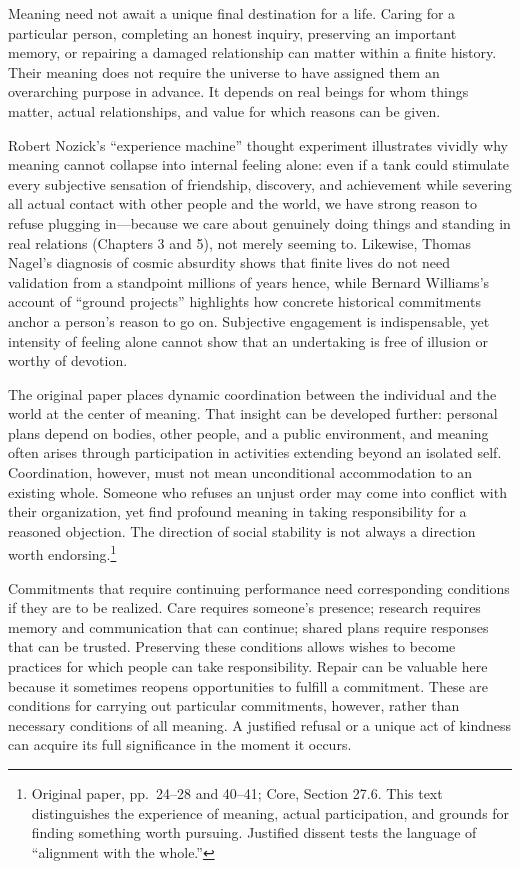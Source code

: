 \documentclass[
  english,
  11pt,
  oneside]{book}
\begin{document}
Meaning need not await a unique final destination for a life. Caring for a particular person, completing an honest inquiry, preserving an important memory, or repairing a damaged relationship can matter within a finite history. Their meaning does not require the universe to have assigned them an overarching purpose in advance. It depends on real beings for whom things matter, actual relationships, and value for which reasons can be given.

Robert Nozick's ``experience machine'' thought experiment illustrates vividly why meaning cannot collapse into internal feeling alone: even if a tank could stimulate every subjective sensation of friendship, discovery, and achievement while severing all actual contact with other people and the world, we have strong reason to refuse plugging in---because we care about genuinely doing things and standing in real relations (Chapters 3 and 5), not merely seeming to. Likewise, Thomas Nagel's diagnosis of cosmic absurdity shows that finite lives do not need validation from a standpoint millions of years hence, while Bernard Williams's account of ``ground projects'' highlights how concrete historical commitments anchor a person's reason to go on. Subjective engagement is indispensable, yet intensity of feeling alone cannot show that an undertaking is free of illusion or worthy of devotion.

The original paper places dynamic coordination between the individual and the world at the center of meaning. That insight can be developed further: personal plans depend on bodies, other people, and a public environment, and meaning often arises through participation in activities extending beyond an isolated self. Coordination, however, must not mean unconditional accommodation to an existing whole. Someone who refuses an unjust order may come into conflict with their organization, yet find profound meaning in taking responsibility for a reasoned objection. The direction of social stability is not always a direction worth endorsing.\footnote{\hypertarget{ph-note-57}{}Original paper, pp.~24--28 and 40--41; Core, Section 27.6. This text distinguishes the experience of meaning, actual participation, and grounds for finding something worth pursuing. Justified dissent tests the language of ``alignment with the whole.''}

Commitments that require continuing performance need corresponding conditions if they are to be realized. Care requires someone's presence; research requires memory and communication that can continue; shared plans require responses that can be trusted. Preserving these conditions allows wishes to become practices for which people can take responsibility. Repair can be valuable here because it sometimes reopens opportunities to fulfill a commitment. These are conditions for carrying out particular commitments, however, rather than necessary conditions of all meaning. A justified refusal or a unique act of kindness can acquire its full significance in the moment it occurs.
\end{document}
